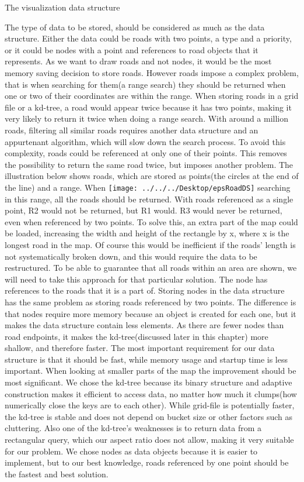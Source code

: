 \documentclass[a4paper,10pt,titlepage]{article}
\begin{document}
The visualization data structure
 
The type of data to be stored, should be considered as much as the data structure. Either the data could be roads with two points, a type and a priority, or it could be nodes with a point and references to road objects that it represents. As we want to draw roads and not nodes, it would be the most memory saving decision to store roads. However roads impose a complex problem, that is when searching for them(a range search) they should be returned when one or two of their coordinates are within the range. When storing roads in a grid file or a kd-tree, a road would appear twice because it has two points, making it very likely to return it twice when doing a range search. With around a million roads, filtering all similar roads requires another data structure and an appurtenant algorithm, which will slow down the search process. To avoid this complexity, roads could be referenced at only one of their points. This removes the possibility to return the same road twice, but imposes another problem. The illustration below shows roads, which are stored as points(the circles at the end of the line) and a range. When
\texttt{[image: ../../../Desktop/epsRoadDS]} searching in this range, all the roads should be returned. With roads referenced as a single point, R2 would not be returned, but R1 would. R3 would never be returned, even when referenced by two points. To solve this, an extra part of the map could be loaded, increasing the width and height of the rectangle by x, where x is the longest road in the map. Of course this would be inefficient if the roads’ length is not systematically broken down, and this would require the data to be restructured. To be able to guarantee that all roads within an area are shown, we will need to take this approach for that particular solution.
The node has references to the roads that it is a part of. Storing nodes in the data structure has the same problem as storing roads referenced by two points. The difference is that nodes require more memory because an object is created for each one, but it makes the data structure contain less elements. As there are fewer nodes than road endpoints, it makes the kd-tree(discussed later in this chapter) more shallow, and therefore faster. 
The most important requirement for our data structure is that it should be fast, while memory usage and startup time is less important. When looking at smaller parts of the map the improvement should be most significant. We chose the kd-tree because its binary structure and adaptive construction makes it efficient to access data, no matter how much it clumps(how numerically close the keys are to each other). While grid-file is potentially faster, the kd-tree is stable and does not depend on bucket size or other factors such as cluttering. Also one of the kd-tree’s weaknesses is to return data from a rectangular query, which our aspect ratio does not allow, making it very suitable for our problem. We chose nodes as data objects because it is easier to implement, but to our best knowledge, roads referenced by one point should be the fastest and best solution.
\end{document}
